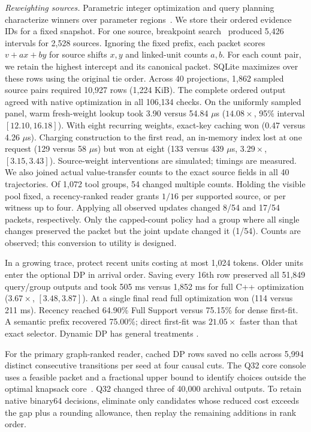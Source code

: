 \documentclass[conference]{IEEEtran}
\begin{document}
\noindent\textit{Reweighting sources.} Parametric integer optimization and query planning characterize winners over parameter regions~\cite{crema,ganguly}. We store their ordered evidence IDs for a fixed snapshot. For one source, breakpoint search~\cite{eisner} produced 5,426 intervals for 2,528 sources. Ignoring the fixed prefix, each packet scores $v+ax+by$ for source shifts $x,y$ and linked-unit counts $a,b$. For each count pair, we retain the highest intercept and its canonical packet. SQLite maximizes over these rows using the original tie order. Across 40 projections, 1,862 sampled source pairs required 10,927 rows (1,224 KiB). The complete ordered output agreed with native optimization in all 106,134 checks. On the uniformly sampled panel, warm fresh-weight lookup took 3.90 versus 54.84 $\mu$s ($14.08\times$, 95\% interval $[12.10,16.18]$). With eight recurring weights, exact-key caching won (0.47 versus 4.26 $\mu$s). Charging construction to the first read, an in-memory index lost at one request (129 versus 58 $\mu$s) but won at eight (133 versus 439 $\mu$s, $3.29\times$, $[3.15,3.43]$). Source-weight interventions are simulated; timings are measured. We also joined actual value-transfer counts to the exact source fields in all 40 trajectories. Of 1,072 tool groups, 54 changed multiple counts. Holding the visible pool fixed, a recency-ranked reader grants $1/16$ per supported source, or per witness up to four. Applying all observed updates changed 8/54 and 17/54 packets, respectively. Only the capped-count policy had a group where all single changes preserved the packet but the joint update changed it (1/54). Counts are observed; this conversion to utility is designed.

In a growing trace, protect recent units costing at most 1,024 tokens. Older units enter the optional DP in arrival order. Saving every 16th row preserved all 51,849 query/group outputs and took 505 ms versus 1,852 ms for full C++ optimization ($3.67\times$, $[3.48,3.87]$). At a single final read full optimization won (114 versus 211 ms). Recency reached 64.90\% Full Support versus 75.15\% for dense first-fit. A semantic prefix recovered 75.00\%; direct first-fit was $21.05\times$ faster than that exact selector. Dynamic DP has general treatments \cite{dynamicdp}.

For the primary graph-ranked reader, cached DP rows saved no cells across 5,994 distinct consecutive transitions per seed at four causal cuts. The Q32 core console uses a feasible packet and a fractional upper bound to identify choices outside the optimal knapsack core~\cite{coreknap}. Q32 changed three of 40,000 archival outputs. To retain native binary64 decisions, eliminate only candidates whose reduced cost exceeds the gap plus a rounding allowance, then replay the remaining additions in rank order.
\end{document}
